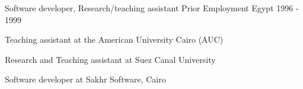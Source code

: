 \begin{cventries}
  \cventry
    {Software developer, Research/teaching assistant}
    {Prior Employment} %
    {Egypt} %
    {1996 - 1999} %
    {
      \begin{cvitems} %
        \item {Teaching assistant at the American University Cairo (AUC)} 
		\item {Research and Teaching assistant at Suez Canal University}
		\item {Software developer at Sakhr Software, Cairo}
      \end{cvitems}
    }




\end{cventries}

